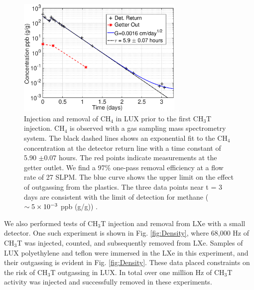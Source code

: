 \begin{figure}[h!]\centering
\includegraphics[width=80mm]{fig/July_CH4_wOG.eps}
\caption{Injection and removal of CH$_4$ in LUX prior to the first CH$_3$T injection. CH$_4$ is observed with a gas sampling mass spectrometry system. The black dashed lines shows an exponential fit to the CH$_4$ concentration at the detector return line with a time constant of 5.90 $\pm 0.07$ hours.  The red points indicate measurements at the getter outlet. We find a 97\% one-pass removal efficiency at a flow rate of 27 SLPM. The blue curve shows the upper limit on the effect of outgassing from the plastics. The three data points near t = 3 days are consistent with the limit of detection for methane ($\sim \rm 5\times10^{-3}$ ppb (g/g)) .}
\label{fig:ch4_removal}
\end{figure}

We also performed tests of CH$_3$T injection and removal from LXe with a small detector. One such experiment is shown in Fig. \ref{fig:Density}, where 68,000 Hz of CH$_3$T was injected, counted, and subsequently removed from LXe. Samples of LUX polyethylene and teflon were immersed in the LXe in this experiment, and their outgassing is evident in Fig. \ref{fig:Density}. These data placed constraints on the risk of CH$_3$T outgassing in LUX. In total over one million Hz of CH$_3$T activity was injected and successfully removed in these experiments.

